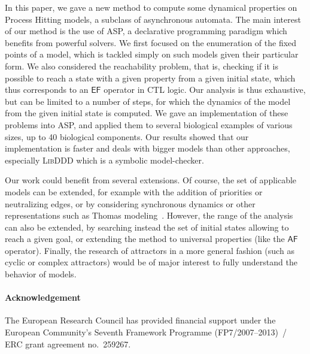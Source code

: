 In this paper, we gave a new method to compute some dynamical properties
on Process Hitting models, a subclass of asynchronous automata.
The main interest of our method is the use of ASP,
a declarative programming paradigm which benefits from powerful solvers.
We first focused on the enumeration of the fixed points of a model,
which is tackled simply on such models given their particular form.
We also considered the reachability problem, that is,
checking if it is possible to reach a state with a given property
from a given initial state,
which thus corresponds to an $\mathsf{EF}$ operator in CTL logic.
Our analysis is thus exhaustive, but can be limited to a number of steps,
for which the dynamics of the model from the given initial state is computed.
We gave an implementation of these problems into ASP,
and applied them to several biological examples of various sizes, up to
40 biological components.
Our results showed that our implementation is faster and deals with bigger models
than other approaches, especially \textsc{LibDDD} which is a symbolic model-checker.

Our work could benefit from several extensions.
Of course, the set of applicable models can be extended,
for example with the addition
of priorities or neutralizing edges,
or by considering synchronous dynamics or other representations
such as Thomas modeling~\cite{BernotSemBRN}.
However, the range of the analysis can also be extended,
by searching instead the set of initial states
allowing to reach a given goal,
or extending the method to universal properties (like the $\mathsf{AF}$ operator).
Finally, the research of attractors in a more general fashion
(such as cyclic or complex attractors)
would be of major interest to fully understand the behavior of models.

{\small
\paragraph{Acknowledgement}
The European Research Council has provided financial support
under the European Community's Seventh Framework Programme (FP7/2007--2013)~/
ERC grant agreement no.~259267.
}
